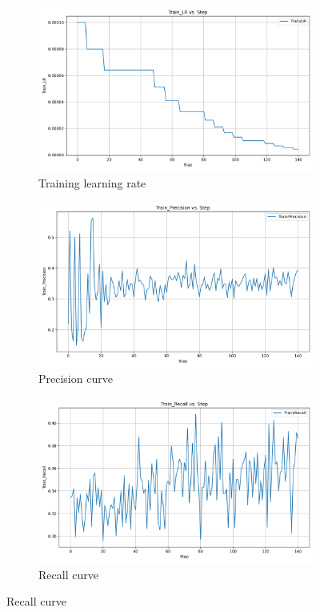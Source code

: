 \documentclass[12pt]{article}
\begin{document}
\begin{figure}[!ht]
	\centering
	\begin{subfigure}[b]{0.32\textwidth}
	\includegraphics[width=\linewidth]{Train_LR.png}
	\caption{Training learning rate}
\end{subfigure}
\hfill
	\begin{subfigure}[b]{0.32\textwidth}
	\includegraphics[width=\linewidth]{Train_Precision.png}
	\caption{Precision curve}
\end{subfigure}
\hfill
	\begin{subfigure}[b]{0.32\textwidth}
	\includegraphics[width=\linewidth]{Train_Recall.png}
	\caption{Recall curve}
	\end{subfigure}
\end{figure}
\end{document}
